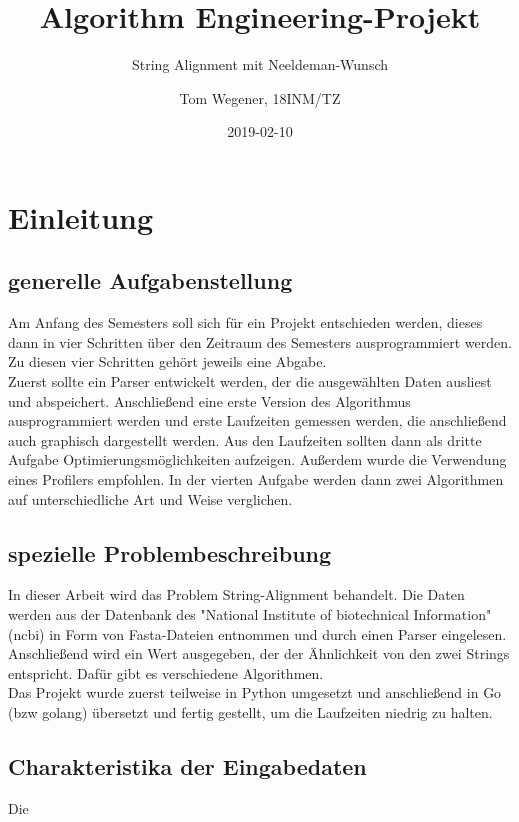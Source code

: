 \documentclass[a4paper]{article}
\title{Algorithm Engineering-Projekt}
\subtitle{String Alignment mit Neeldeman-Wunsch}
\date{2019-02-10}
\author{Tom Wegener, 18INM/TZ}
\begin{document}
\pagestyle{empty}

\maketitle

\newpage

\tableofcontents

\newpage

\pagestyle{fancy}

\setcounter{page}{1}

\section{Einleitung}
\subsection{generelle Aufgabenstellung}
Am Anfang des Semesters soll sich für ein Projekt entschieden werden, dieses dann in vier Schritten über den Zeitraum des Semesters ausprogrammiert werden. Zu diesen vier Schritten gehört jeweils eine Abgabe. \\
Zuerst sollte ein Parser entwickelt werden, der die ausgewählten Daten ausliest und abspeichert. Anschließend eine erste Version des Algorithmus ausprogrammiert werden und erste Laufzeiten gemessen werden, die anschließend auch graphisch dargestellt werden. Aus den Laufzeiten sollten dann als dritte Aufgabe Optimierungsmöglichkeiten aufzeigen. Außerdem wurde die Verwendung eines Profilers empfohlen. In der vierten Aufgabe werden dann zwei Algorithmen auf unterschiedliche Art und Weise verglichen.

\subsection{spezielle Problembeschreibung}
In dieser Arbeit wird das Problem String-Alignment behandelt. Die Daten werden aus der Datenbank des "National Institute of biotechnical Information" (ncbi) in Form von Fasta-Dateien entnommen und durch einen Parser eingelesen. \\
Anschließend wird ein Wert ausgegeben, der der Ähnlichkeit von den zwei Strings entspricht.
Dafür gibt es verschiedene Algorithmen.\\
Das Projekt wurde zuerst teilweise in Python umgesetzt und anschließend in Go (bzw golang) übersetzt und fertig gestellt, um die Laufzeiten niedrig zu halten.

\subsection{Charakteristika der Eingabedaten}
Die 
\end{document}
